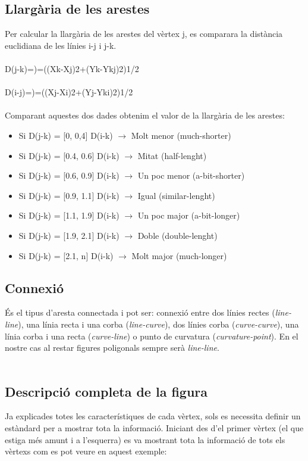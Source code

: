 \documentclass{article}
\begin{document}
\subsection{Llargària de les arestes}
Per calcular la llargària de les arestes del vèrtex  j, es comparara la distància euclidiana de les línies i-j i j-k.
\\
\\
D(j-k)=)=((Xk-Xj)2+(Yk-Ykj)2)1/2
\\
\\
D(i-j)=)=((Xj-Xi)2+(Yj-Yki)2)1/2
\\
\\
Comparant aquestes dos dades obtenim el valor de la llargària de les arestes:
\begin{itemize}
\item Si D(j-k) = [0, 0,4]   D(i-k) $\rightarrow$  Molt menor (much-shorter)
\item Si D(j-k) = [0.4, 0.6] D(i-k) $\rightarrow$  Mitat (half-lenght)
\item Si D(j-k) = [0.6, 0.9] D(i-k) $\rightarrow$  Un poc menor (a-bit-shorter)
\item Si D(j-k) = [0.9, 1.1] D(i-k) $\rightarrow$  Igual (similar-lenght)
\item Si D(j-k) = [1.1, 1.9] D(i-k) $\rightarrow$  Un poc major (a-bit-longer)
\item Si D(j-k) = [1.9, 2.1] D(i-k) $\rightarrow$  Doble (double-lenght)
\item Si D(j-k) = [2.1, n]   D(i-k) $\rightarrow$  Molt major (much-longer)
\end{itemize}

\subsection{Connexió}
És el tipus d'aresta connectada i pot ser: connexió entre dos línies rectes (\emph{line-line}), una línia recta i una corba (\emph{line-curve}), dos línies corba (\emph{curve-curve}), una línia corba i una recta (\emph{curve-line}) o punto de curvatura (\emph{curvature-point}).
En el nostre cas al restar figures poligonals sempre serà \emph{line-line}.
\\
\\
\subsection{Descripció completa de la figura}
Ja explicades totes les característiques de cada vèrtex, sols es necessita definir un estàndard per a mostrar tota la informació.
Iniciant des d'el primer vèrtex (el que estiga més amunt i a l'esquerra) es va mostrant tota la informació de tots els vèrtexs com es pot veure en aquest exemple:
  
\end{document}
